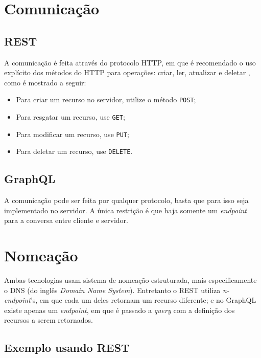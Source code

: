 \section{Comunicação}\label{comunicauxe7uxe3o}

\subsection{REST}\label{rest-1}

A comunicação é feita através do protocolo HTTP, em que é recomendado o
uso explícito dos métodos do HTTP para operações: criar, ler, atualizar
e deletar \cite{rodriguez:2008}, como é mostrado a seguir:

\begin{itemize}
\itemsep1pt\parskip0pt
\item
  Para criar um recurso no servidor, utilize o método \texttt{POST};
\item
  Para resgatar um recurso, use \texttt{GET};
\item
  Para modificar um recurso, use \texttt{PUT};
\item
  Para deletar um recurso, use \texttt{DELETE}.
\end{itemize}

\subsection{GraphQL}\label{graphql-1}

A comunicação pode ser feita por qualquer protocolo, basta que para isso
seja implementado no servidor. A única restrição é que haja somente um
\emph{endpoint} para a conversa entre cliente e servidor.

\section{Nomeação}\label{nomeauxe7uxe3o}

Ambas tecnologias usam sistema de nomeação estruturada, mais
especificamente o DNS (do inglês \emph{Domain Name System}). Entretanto
o REST utiliza \emph{n-endpoint}'s, em que cada um deles retornam um
recurso diferente; e no GraphQL existe apenas um \emph{endpoint}, em que
é passado a \emph{query} com a definição dos recursos a serem
retornados.

\subsection{Exemplo usando REST}\label{exemplo-usando-rest}

